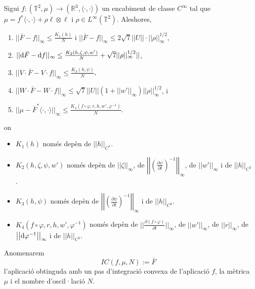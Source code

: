 \begin{teo}
    Sigui $f:(\mathbb T^2, \mu)\to(\mathbb R^3, \langle\cdot, \cdot\rangle)$ un encabiment de classe $C^\infty$ tal que $\mu = f^*\langle\cdot, \cdot\rangle + \rho\ell\otimes\ell$ i $\rho\in L^\infty(\mathbb T^2)$. Aleshores, 
    \begin{enumerate}
        \item $||\bar F-f||_\infty\le\frac{K_1(h)}{N}$ i $||\bar F-f||_\infty\le 2\sqrt7||U||\cdot||\rho||^{1/2}_\infty$,
        \item $||\text d\bar F-\text df||_\infty\le\frac{K_2(h,\zeta,\psi,w')}{N} + \sqrt7||\rho||^{1/2}_\infty||$,
        \item $||V\cdot\bar F-V\cdot f||_\infty\le\frac{K_3(h,\psi)}{N}$,
        \item $||W\cdot\bar F-W\cdot f||_\infty\le\sqrt7||U||(1+||w'||_\infty)||\rho||^{1/2}_\infty$, i
        \item $||\mu - \bar F^*\langle\cdot, \cdot\rangle||_\infty\le\frac{K_4(f\circ\varphi,r,h,w',\varphi^{-1})}{N}$.
    \end{enumerate}
    on 
    \begin{itemize}
        \item $K_1(h)$ només depèn de $||h||_{C^1}$.
        \item $K_2(h,\zeta,\psi,w')$ només depèn de $||\zeta||_\infty$, de $\left|\left|\left(  \frac{\partial\psi}{\partial t}\right)^{-1}\right|\right|_\infty$, de $||w'||_\infty$ i de $||h||_{C^2}$.
        \item $K_3(h,\psi)$ només depèn de $\left|\left|\left(  \frac{\partial\psi}{\partial t}\right)^{-1}\right|\right|_\infty$ i de $||h||_{C^2}$.
        \item $K_4(f\circ\varphi,r,h,w',\varphi^{-1})$ només depèn de $||\frac{\partial(f\circ\varphi)}{\partial t}||_\infty$, de $||w'||_\infty$, de $||r||_\infty$, de $\left|\left|\text d\varphi^{-1}\right|\right|_\infty$ i de $||h||_{C^2}$.
    \end{itemize}
\end{teo}
\begin{nota}
    Anomenarem 
    \begin{equation*}
        IC(f,\mu,N):=\bar F
    \end{equation*}
    l'aplicació obtinguda amb un pas d'integració convexa de l'aplicació $f$, la mètrica $\mu$ i el nombre d'oscil·lació $N$.
\end{nota}
